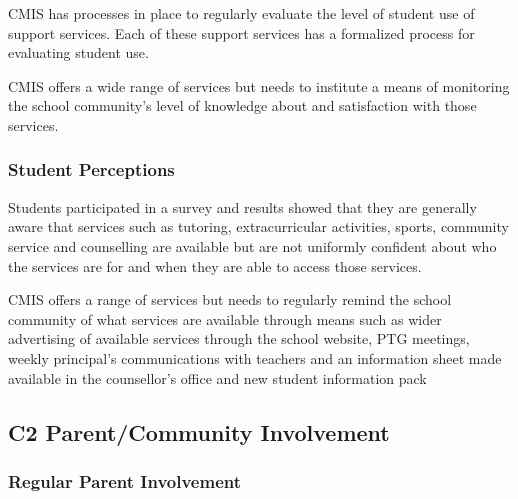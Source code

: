 \begin{findings}

CMIS has processes in place to regularly evaluate the level of student use of support services.  Each of these support services has a formalized process for evaluating student use.


CMIS offers a wide range of services but needs to institute a means of monitoring the school community’s level of knowledge about and satisfaction with those services.
\end{findings}

\subsubsection{Student Perceptions}



\begin{findings}
Students participated in a survey and results showed that they are generally aware that services such as tutoring, extracurricular activities, sports, community service and counselling are available but are not uniformly confident about who the services are for and when they are able to access those services.


CMIS offers a range of services but needs to regularly remind the school community of what services are available through means such as wider advertising of available services through the school website, PTG meetings, weekly principal’s communications with teachers and an information sheet made available in the counsellor’s office and new student information pack
\end{findings}

\subsection{C2 Parent/Community Involvement}

\subsubsection{Regular Parent Involvement}

